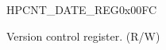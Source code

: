 \begin{register}{H}{PCNT\_DATE\_REG}{0x00FC}\label{regdesc:PCNTDATEREG}
%
\regnewline%
\begin{regdesc}\begin{reglist}
\label{fielddesc:PCNTDATE}\item [PCNT\_DATE] Version control register. (R/W)
\end{reglist}\end{regdesc}
\end{register}
